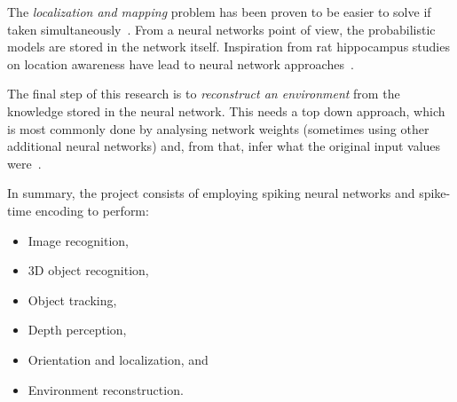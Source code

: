 The \emph{localization and mapping} problem has been proven to be easier to solve if taken simultaneously~\cite{Durrant-Whyte2006-slam,Fuentes-Pacheco2012-slam}. From a neural networks point of view, the probabilistic models are stored in the network itself. Inspiration from rat hippocampus studies on location awareness have lead to neural network approaches~\cite{Milford2004-ratslam}.

The final step of this research is to \emph{reconstruct an environment} from the knowledge stored in the neural network. This needs a top down approach, which is most commonly done by analysing network weights (sometimes using other additional neural networks) and, from that, infer what the original input values were~\cite{Anh-Dung-deconv-nets}. 


In summary, the project consists of employing spiking neural networks and spike-time encoding to perform:
\begin{itemize}
  \item Image recognition,
  \item 3D object recognition,
  \item Object tracking,
  \item Depth perception,
  \item Orientation and localization, and
  \item Environment reconstruction.
\end{itemize}